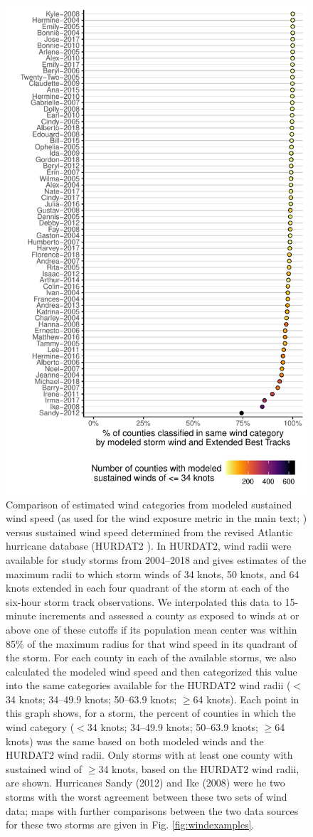 \documentclass[fleqn,10pt,lineno]{olplainarticle}
\begin{document}
\begin{figure}[tbhp!]
\centering
\includegraphics[width=0.6\linewidth]{figures/windcomparison}
\caption{Comparison of estimated wind categories from modeled sustained wind speed (as used for the wind exposure metric in the main text; \cite{stormwindmodel}) versus sustained wind speed determined from the revised Atlantic hurricane database (HURDAT2 \cite{landsea2013}). In HURDAT2, wind radii were available for study storms from 2004--2018 and gives estimates of the maximum radii to which storm winds of 34 knots, 50 knots, and 64 knots extended in each four quadrant of the storm at each of the six-hour storm track observations. We interpolated this data to 15-minute increments and assessed a county as exposed to winds at or above one of these cutoffs if its population mean center was within 85\% of the maximum radius for that wind speed in its quadrant of the storm. For each county in each of the available storms, we also calculated the modeled wind speed \cite{stormwindmodel} and then categorized this value into the same categories available for the HURDAT2 wind radii ($<$34 knots; 34--49.9 knots; 50--63.9 knots; $\ge$64 knots). Each point in this graph shows, for a storm, the percent of counties in which the wind category ($<$34 knots; 34--49.9 knots; 50--63.9 knots; $\ge$64 knots) was the same based on both modeled winds and the HURDAT2 wind radii. Only storms with at least one county with sustained wind of $\ge$34 knots, based on the HURDAT2 wind radii, are shown. Hurricanes Sandy (2012) and Ike (2008) were he two storms with the worst agreement between these two sets of wind data; maps with further comparisons between the two data sources for these two storms are given in Fig. \ref{fig:windexamples}.}
\label{fig:windcomparison}
\end{figure}
\end{document}
